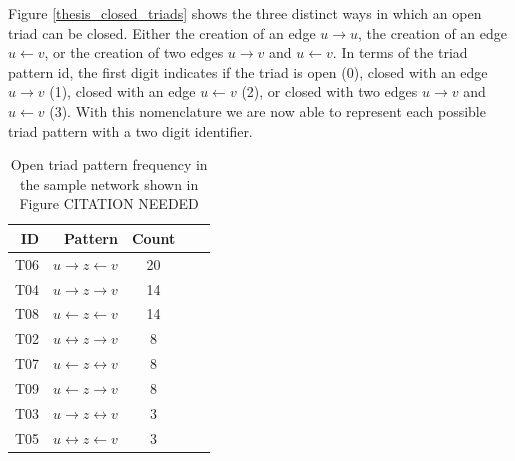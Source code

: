 Figure \ref{thesis_closed_triads} shows the three distinct ways in which an open triad can be closed. Either the creation of an edge $u \rightarrow u$, the creation of an edge $u \leftarrow v$, or the creation of two edges $u \rightarrow v$ and $u \leftarrow v$. In terms of the triad pattern id, the first digit indicates if the triad is open (0), closed with an edge $u \rightarrow v$ (1), closed with an edge $u \leftarrow v$ (2), or closed with two edges $u \rightarrow v$ and $u \leftarrow v$ (3). With this nomenclature we are now able to represent each possible triad pattern with a two digit identifier. 

\begin{table}[t]
\caption{Open triad pattern frequency in the sample network shown in Figure CITATION NEEDED}
\label{sample_network_freq}
\vskip 0.15in
\begin{center}
\begin{small}
\begin{sc}
\begin{tabular}{rrccr}
\hline
ID & Pattern & Count \\
\hline
T06 & $u \rightarrow z \leftarrow v $ & 20 \\
T04 &$ u \rightarrow z \rightarrow v$ & 14 \\
T08 & $u \leftarrow z \leftarrow v$ & 14 \\
T02 & $u \leftrightarrow z \rightarrow v$ & 8 \\
T07 & $u \leftarrow z \leftrightarrow v$ & 8 \\
T09 & $u \leftarrow z \rightarrow v$ & 8 \\
T03 & $u \rightarrow z \leftrightarrow v$ & 3 \\
T05 & $u \leftrightarrow z \leftarrow v$ & 3 \\

\hline
\end{tabular}
\end{sc}
\end{small}
\end{center}
\vskip -0.1in
\end{table}


